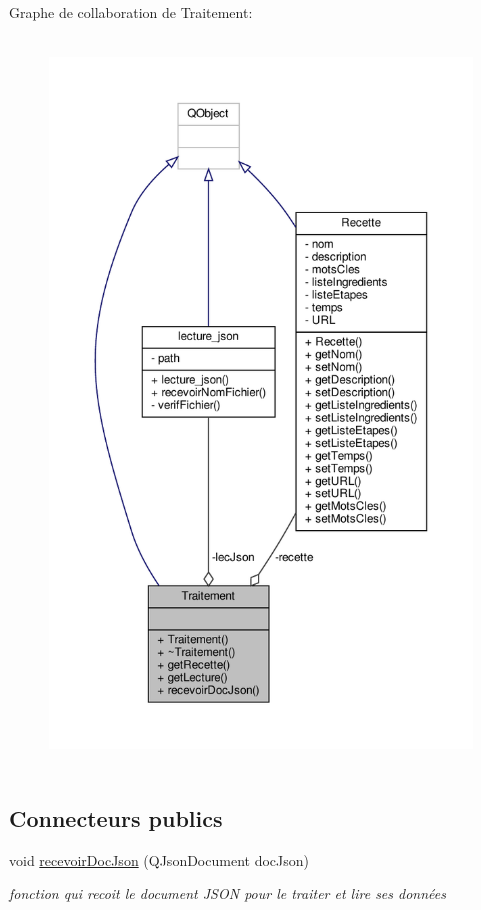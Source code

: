 Graphe de collaboration de Traitement\+:\nopagebreak
\begin{figure}[H]
\begin{center}
\leavevmode
\includegraphics[height=550pt]{classTraitement__coll__graph}
\end{center}
\end{figure}
\subsection*{Connecteurs publics}
\begin{DoxyCompactItemize}
\item 
void \hyperlink{classTraitement_a7bbc7e2034b55a9de14c010be7d3de11}{recevoir\+Doc\+Json} (Q\+Json\+Document doc\+Json)
\begin{DoxyCompactList}\small\item\em fonction qui recoit le document J\+S\+ON pour le traiter et lire ses données \end{DoxyCompactList}\end{DoxyCompactItemize}
